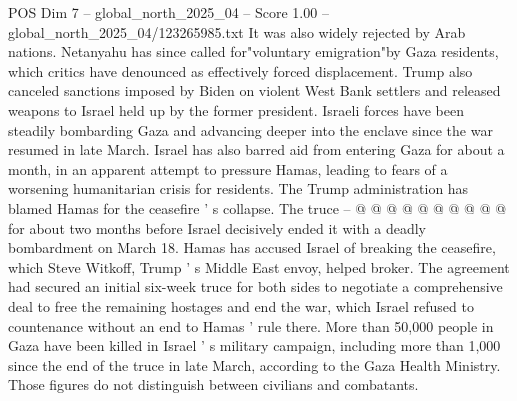 \begin{textsample}{POS Dim 7 – global\_north\_2025\_04 – Score 1.00 – global\_north\_2025\_04/123265985.txt}
It was also widely rejected by Arab nations.
Netanyahu has since called for"voluntary emigration"by Gaza residents, which critics have denounced as effectively forced displacement.
Trump also canceled sanctions imposed by Biden on violent West Bank settlers and released weapons to Israel held up by the former president.
Israeli forces have been steadily bombarding Gaza and advancing deeper into the enclave since the war resumed in late March.
Israel has also barred aid from entering Gaza for about a month, in an apparent attempt to pressure Hamas, leading to fears of a worsening humanitarian crisis for residents.
The Trump administration has blamed Hamas for the ceasefire ' s collapse.
The truce -- @ @ @ @ @ @ @ @ @ @ for about two months before Israel decisively ended it with a deadly bombardment on March 18.
Hamas has accused Israel of breaking the ceasefire, which Steve Witkoff, Trump ' s Middle East envoy, helped broker.
The agreement had secured an initial six-week truce for both sides to negotiate a comprehensive deal to free the remaining hostages and end the war, which Israel refused to countenance without an end to Hamas ' rule there.
More than 50,000 people in Gaza have been killed in Israel ' s military campaign, including more than 1,000 since the end of the truce in late March, according to the Gaza Health Ministry.
Those figures do not distinguish between civilians and combatants.

\end{textsample}
